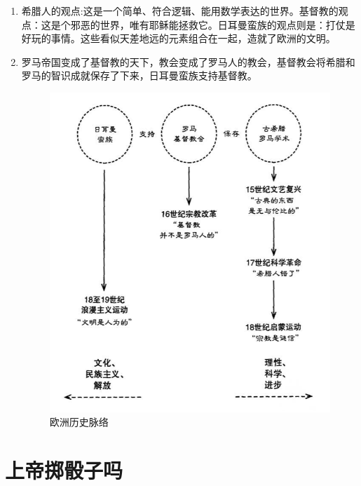 \documentclass[UTF8]{ctexart}
\begin{document}
		\begin{enumerate}
		
			\item 希腊人的观点:这是一个简单、符合逻辑、能用数学表达的世界。基督教的观点：这是个邪恶的世界，唯有耶稣能拯救它。日耳曼蛮族的观点则是：打仗是好玩的事情。这些看似天差地远的元素组合在一起，造就了欧洲的文明。
			
			\item 罗马帝国变成了基督教的天下，教会变成了罗马人的教会，基督教会将希腊和罗马的智识成就保存了下来，日耳曼蛮族支持基督教。
			
			\begin{figure}[htb]
				\includegraphics[scale=0.6]{13_1}
				\caption{欧洲历史脉络} 	
			\end{figure}
		\end{enumerate}
	
	\newpage
	
	\section{上帝掷骰子吗}
	
	
\end{document}
